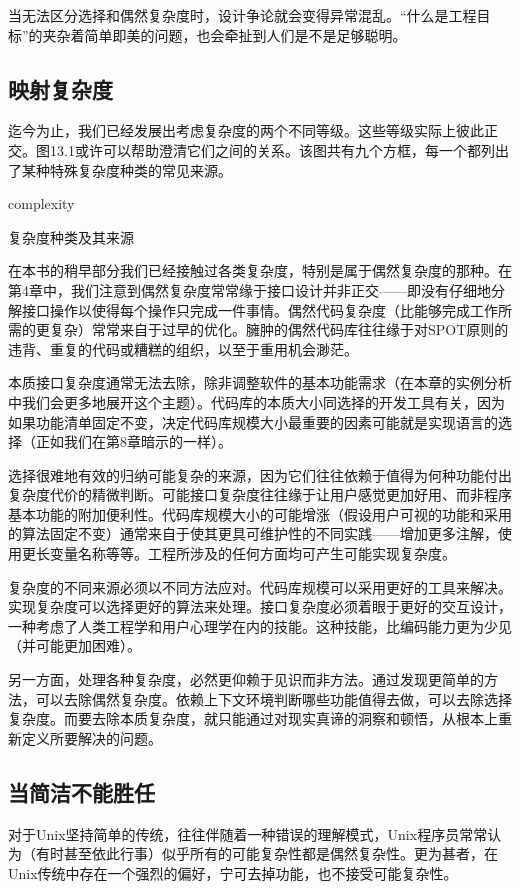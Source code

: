 \documentclass[12pt,oneside]{book}
\begin{document}
\begin{common-format}
当无法区分选择和偶然复杂度时，设计争论就会变得异常混乱。“什么是工程目标”的夹杂着简单即美的问题，也会牵扯到人们是不是足够聪明。

\subsection{映射复杂度}
迄今为止，我们已经发展出考虑复杂度的两个不同等级。这些等级实际上彼此正交。图13.1或许可以帮助澄清它们之间的关系。该图共有九个方框，每一个都列出了某种特殊复杂度种类的常见来源。

\begin{fig}{complexity}
\caption{复杂度种类及其来源}
\label{fig:complexity}
\end{fig}

在本书的稍早部分我们已经接触过各类复杂度，特别是属于偶然复杂度的那种。在第4章中，我们注意到偶然复杂度常常缘于接口设计并非正交——即没有仔细地分解接口操作以使得每个操作只完成一件事情。偶然代码复杂度（比能够完成工作所需的更复杂）常常来自于过早的优化。臃肿的偶然代码库往往缘于对SPOT原则的违背、重复的代码或糟糕的组织，以至于重用机会渺茫。

本质接口复杂度通常无法去除，除非调整软件的基本功能需求（在本章的实例分析中我们会更多地展开这个主题）。代码库的本质大小同选择的开发工具有关，因为如果功能清单固定不变，决定代码库规模大小最重要的因素可能就是实现语言的选择（正如我们在第8章暗示的一样）。

选择很难地有效的归纳可能复杂的来源，因为它们往往依赖于值得为何种功能付出复杂度代价的精微判断。可能接口复杂度往往缘于让用户感觉更加好用、而非程序基本功能的附加便利性。代码库规模大小的可能增涨（假设用户可视的功能和采用的算法固定不变）通常来自于使其更具可维护性的不同实践——增加更多注解，使用更长变量名称等等。工程所涉及的任何方面均可产生可能实现复杂度。

复杂度的不同来源必须以不同方法应对。代码库规模可以采用更好的工具来解决。实现复杂度可以选择更好的算法来处理。接口复杂度必须着眼于更好的交互设计，一种考虑了人类工程学和用户心理学在内的技能。这种技能，比编码能力更为少见（并可能更加困难）。

另一方面，处理各种复杂度，必然更仰赖于见识而非方法。通过发现更简单的方法，可以去除偶然复杂度。依赖上下文环境判断哪些功能值得去做，可以去除选择复杂度。而要去除本质复杂度，就只能通过对现实真谛的洞察和顿悟，从根本上重新定义所要解决的问题。

\subsection{当简洁不能胜任}
对于Unix坚持简单的传统，往往伴随着一种错误的理解模式，Unix程序员常常认为（有时甚至依此行事）似乎所有的可能复杂性都是偶然复杂性。更为甚者，在Unix传统中存在一个强烈的偏好，宁可去掉功能，也不接受可能复杂性。


\end{common-format}
\end{document}
